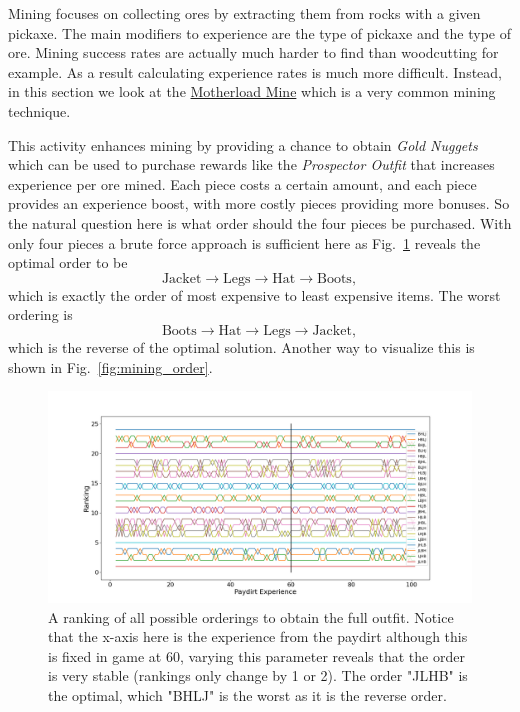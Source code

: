 

Mining focuses on collecting ores by extracting them from rocks with a given pickaxe. The main modifiers to experience are the type of pickaxe and the type of ore. Mining success rates are actually much harder to find than woodcutting for example. As a result calculating experience rates is much more difficult. Instead, in this section we look at the \href{https://oldschool.runescape.wiki/w/Motherlode_Mine}{Motherload Mine} which is a very common mining technique. 

This activity enhances mining by providing a chance to obtain \emph{Gold Nuggets} which can be used to purchase rewards like the \emph{Prospector Outfit} that increases experience per ore mined. Each piece costs a certain amount, and each piece provides an experience boost, with more costly pieces providing more bonuses. So the natural question here is what order should the four pieces be purchased. With only four pieces a brute force approach is sufficient here as Fig.~\ref{fig:pay_dirt} reveals the optimal order to be 
\begin{equation}
\text{Jacket} \to \text{Legs} \to \text{Hat} \to \text{Boots},
\end{equation}
which is exactly the order of most expensive to least expensive items. The worst ordering is 
\begin{equation}
\text{Boots} \to \text{Hat} \to \text{Legs} \to \text{Jacket},
\end{equation}
which is the reverse of the optimal solution. Another way to visualize this is shown in Fig.~\ref{fig:mining_order}.


\begin{figure}
	\centering
	\includegraphics[width=\linewidth]{img/mining/varying_paydirt.100.png}
	\caption{
		A ranking of all possible orderings to obtain the full outfit. Notice that the x-axis here is the experience from the paydirt although this is fixed in game at 60, varying this parameter reveals that the order is very stable (rankings only change by 1 or 2). The order "JLHB" is the optimal, which "BHLJ" is the worst as it is the reverse order.
	}
	\label{fig:pay_dirt}
\end{figure}


